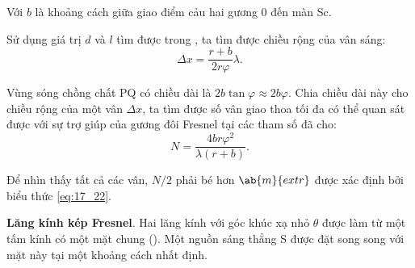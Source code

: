 \noindent
Với $b$ là khoảng cách giữa giao điểm cảu hai gương $0$ đến màn Sc.

Sử dụng giá trị $d$ và $l$ tìm được trong , ta tìm được chiều rộng của vân sáng:
\begin{equation}\label{eq:17_28}
    \Delta{x} = \frac{r + b}{2 r \varphi} \lambda.
\end{equation}

\noindent
Vùng sóng chồng chất PQ có chiều dài là $2b\tan\varphi\approx 2b\varphi$.
Chia chiều dài này cho chiều rộng của một vân $\Delta{x}$, ta tìm được số vân giao thoa tối đa có thể quan sát được với
sự trợ giúp của gương đôi Fresnel tại các tham số đã cho:
\begin{equation}\label{eq:17_29}
    N = \frac{4 b r \varphi^2}{\lambda (r + b)}.
\end{equation}

\noindent
Để nhìn thấy tất cả các vân, $N/2$ phải bé hơn $\ab{m}{extr}$ được xác định bởi biểu thức \eqref{eq:17_22}.

\textbf{Lăng kính kép Fresnel}.
Hai lăng kính với góc khúc xạ nhỏ $\theta$ được làm từ một tấm kính có một mặt chung ().
Một nguồn sáng thẳng S được đặt song song với mặt này tại một khoảng cách nhất định.

